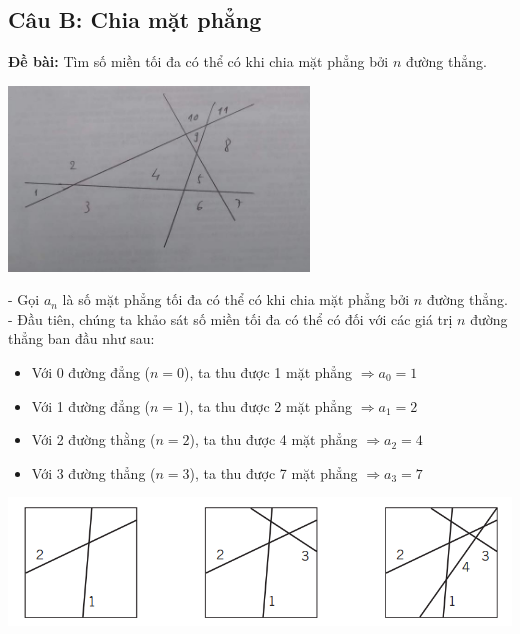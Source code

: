 \documentclass[12pt]{article}
\begin{document}
\begin{sloppypar}
\subsection{Câu B: Chia mặt phẳng}
\begin{tcolorbox}
    \textbf{Đề bài:} Tìm số miền tối đa có thể có khi chia mặt phẳng bởi \(n\) đường thẳng.
\end{tcolorbox}

\begin{center}
    {\includegraphics[width=8cm]{1b.png}}
\end{center}

- Gọi \(a_{n}\) là số mặt phẳng tối đa có thể có khi chia mặt phẳng bởi \(n\) đường thẳng. \\
- Đầu tiên, chúng ta khảo sát số miền tối đa có thể có đối với các giá trị \(n\) đường thẳng ban đầu như sau:

\begin{itemize}
    \item Với 0 đường đẳng (\(n = 0\)), ta thu được 1 mặt phẳng \(\Rightarrow a_{0} = 1\)
    \item Với 1 đường đẳng (\(n = 1\)), ta thu được 2 mặt phẳng \(\Rightarrow a_{1} = 2\)
    \item Với 2 đường thằng (\(n = 2\)), ta thu được 4 mặt phẳng \(\Rightarrow a_{2} = 4\)
    \item Với 3 đường thẳng (\(n = 3\)), ta thu được 7 mặt phẳng \(\Rightarrow a_{3} = 7\)
\end{itemize}

\begin{center}
    {\includegraphics[width=16cm]{ex1b.png}}
\end{center}


\end{sloppypar}
\end{document}
